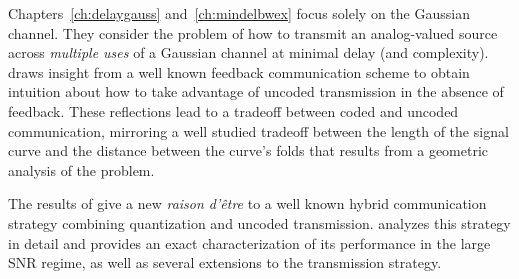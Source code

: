 Chapters~\ref{ch:delaygauss} and~\ref{ch:mindelbwex} focus solely on the
Gaussian channel. They consider the problem of how to transmit an analog-valued
source across \emph{multiple uses} of a Gaussian channel at minimal delay (and
complexity).   draws insight from a well known feedback
communication scheme to obtain intuition about how to take advantage of uncoded
transmission in the absence of feedback. These reflections lead to a tradeoff
between coded and uncoded communication, mirroring a well studied tradeoff
between the length of the signal curve and the distance between the curve's
folds that results from a geometric analysis of the problem.

The results of  give a new \emph{raison d'\^etre} to a well
known hybrid communication strategy combining quantization and uncoded
transmission.   analyzes this strategy in detail and
provides an exact characterization of its performance in the large SNR regime,
as well as several extensions to the transmission strategy. 





